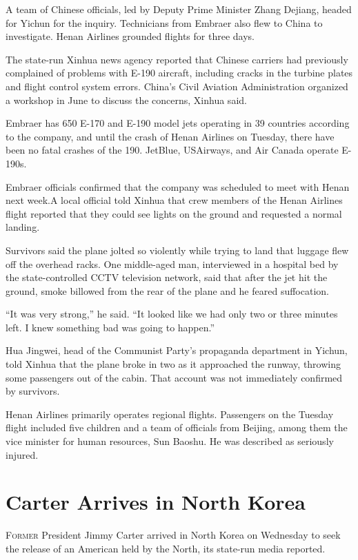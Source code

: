﻿\documentclass[12pt]{article}
\begin{document}
A team of Chinese officials, led by Deputy Prime Minister Zhang Dejiang, headed for Yichun for the
inquiry. Technicians from Embraer also flew to China to investigate. Henan Airlines grounded flights
for three days.

The state-run Xinhua news agency reported that Chinese carriers had previously complained of
problems with E-190 aircraft, including cracks in the turbine plates and flight control system
errors. China's Civil Aviation Administration organized a workshop in June to discuss the concerns,
Xinhua said.

Embraer has 650 E-170 and E-190 model jets operating in 39 countries according to the company, and
until the crash of Henan Airlines on Tuesday, there have been no fatal crashes of the 190. JetBlue,
USAirways, and Air Canada operate E-190s.

Embraer officials confirmed that the company was scheduled to meet with Henan next week.A local
official told Xinhua that crew members of the Henan Airlines flight reported that they could see
lights on the ground and requested a normal landing.

Survivors said the plane jolted so violently while trying to land that luggage flew off the overhead
racks. One middle-aged man, interviewed in a hospital bed by the state-controlled CCTV television
network, said that after the jet hit the ground, smoke billowed from the rear of the plane and he
feared suffocation.

``It was very strong,'' he said. ``It looked like we had only two or three minutes left. I knew
something bad was going to happen.''

Hua Jingwei, head of the Communist Party's propaganda department in Yichun, told Xinhua that the
plane broke in two as it approached the runway, throwing some passengers out of the cabin. That
account was not immediately confirmed by survivors.

Henan Airlines primarily operates regional flights. Passengers on the Tuesday flight included five
children and a team of officials from Beijing, among them the vice minister for human resources, Sun
Baoshu. He was described as seriously injured.

\pagebreak
\section{Carter Arrives in North Korea}

\lettrine{F}{ormer} President Jimmy Carter arrived in North Korea on
Wednesday to seek the release of an American held by the North, its state-run media reported.
\end{document}
